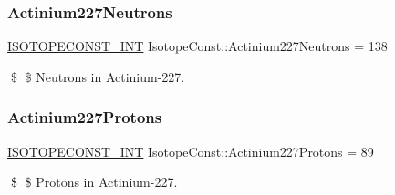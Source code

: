 \subsubsection{\texorpdfstring{Actinium227\+Neutrons}{Actinium227Neutrons}}
{\footnotesize\ttfamily \mbox{\hyperlink{group___isotope_const-_macros_ga5f18360b3e99483a35c32d789e62621c}{I\+S\+O\+T\+O\+P\+E\+C\+O\+N\+S\+T\+\_\+\+I\+NT}} Isotope\+Const\+::\+Actinium227\+Neutrons = 138}

\$ \$ Neutrons in Actinium-\/227. \mbox{\label{group___isotope_const-_actinium-_ac227_ga3ef161adf5eb151629abe590f913a2d3}} 
\subsubsection{\texorpdfstring{Actinium227\+Protons}{Actinium227Protons}}
{\footnotesize\ttfamily \mbox{\hyperlink{group___isotope_const-_macros_ga5f18360b3e99483a35c32d789e62621c}{I\+S\+O\+T\+O\+P\+E\+C\+O\+N\+S\+T\+\_\+\+I\+NT}} Isotope\+Const\+::\+Actinium227\+Protons = 89}

\$ \$ Protons in Actinium-\/227. 